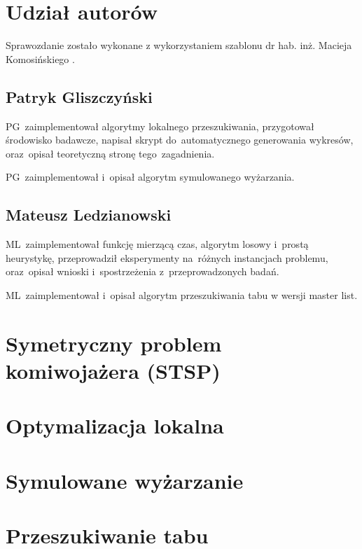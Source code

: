 \documentclass{article}
\begin{document}
\sloppy
{}



\section*{Udział autorów}

Sprawozdanie zostało wykonane z wykorzystaniem szablonu dr hab. inż. Macieja Komosińskiego \cite{MiOIB}.

\subsection*{Patryk Gliszczyński}
PG~zaimplementował algorytmy lokalnego przeszukiwania, przygotował środowisko badawcze, napisał skrypt do~automatycznego generowania wykresów, oraz~opisał teoretyczną stronę tego~zagadnienia.

PG~zaimplementował i~opisał algorytm symulowanego wyżarzania.

\subsection*{Mateusz Ledzianowski}
ML~zaimplementował funkcję mierzącą czas, algorytm losowy i~prostą heurystykę, przeprowadził eksperymenty na~różnych instancjach problemu, oraz~opisał wnioski i~spostrzeżenia z~przeprowadzonych badań.

ML~zaimplementował i~opisał algorytm przeszukiwania tabu w wersji master list.

\clearpage

\section{Symetryczny problem komiwojażera (STSP)}


\clearpage

\section{Optymalizacja lokalna}


\clearpage
{\color{part2}
\section{Symulowane wyżarzanie}


\clearpage

\section{Przeszukiwanie tabu}

}
\clearpage
\end{document}
